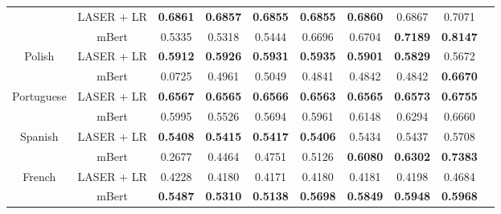 \documentclass[runningheads]{llncs}
\begin{document}
\begin{table}[!htb]
\begin{tabular}{cccccccccc}
                            & LASER + LR             &\textbf{0.6861}    &\textbf{0.6857}    &\textbf{0.6855}    &\textbf{0.6855}     &\textbf{0.6860}     &0.6867   & 0.7071       \\
                            & mBert                  &0.5335    &0.5318   &0.5444   &0.6696     &0.6704         &\textbf{0.7189}  & \textbf{0.8147}             \\ \midrule
\multirow{2}{*}{Polish}                   
                            & LASER + LR             &\textbf{0.5912}    &\textbf{0.5926}    &\textbf{0.5931}    &\textbf{0.5935}     &\textbf{0.5901}     &\textbf{0.5829} &  0.5672     \\
                            & mBert                  &0.0725    &0.4961     &0.5049     &0.4841     &0.4842     &0.4842   &\textbf{0.6670}          \\ \midrule
\multirow{2}{*}{Portuguese}               
                            & LASER + LR             &\textbf{0.6567}    &\textbf{0.6565}    &\textbf{0.6566}    &\textbf{0.6563}     &\textbf{0.6565}     &\textbf{0.6573}   & \textbf{0.6755}    \\
                            & mBert                  &0.5995    &0.5526   &0.5694     &0.5961     &0.6148   &0.6294     &0.6660            \\ \midrule
\multirow{2}{*}{Spanish}                 
                            & LASER + LR             &\textbf{0.5408}    &\textbf{0.5415}    &\textbf{0.5417}    &\textbf{0.5406}     &0.5434     &0.5437   &0.5708        \\
                            & mBert                  &0.2677    &0.4464   &0.4751    &0.5126     &\textbf{0.6080}     &\textbf{0.6302}     &\textbf{0.7383}               \\ \midrule
\multirow{2}{*}{French}                  
                            & LASER + LR             &0.4228    &0.4180    &0.4171    &0.4180     &0.4181     &0.4198   &0.4684            \\
                            & mBert                  &\textbf{0.5487}    &\textbf{0.5310}     &\textbf{0.5138}     &\textbf{0.5698}     &\textbf{0.5849}     &\textbf{0.5948}  & \textbf{0.5968}             \\
                            \bottomrule
\end{tabular}

\end{table}
\end{document}
